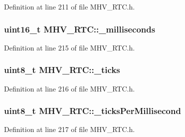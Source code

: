 \-Definition at line 211 of file \-M\-H\-V\-\_\-\-R\-T\-C.\-h.

\hypertarget{class_m_h_v___r_t_c_acd3e486b5e5ee1d8cf9d961c0fdbde57}{
\subsubsection[{\-\_\-milliseconds}]{\setlength{\rightskip}{0pt plus 5cm}uint16\-\_\-t {\bf \-M\-H\-V\-\_\-\-R\-T\-C\-::\-\_\-milliseconds}}}
\label{class_m_h_v___r_t_c_acd3e486b5e5ee1d8cf9d961c0fdbde57}


\-Definition at line 215 of file \-M\-H\-V\-\_\-\-R\-T\-C.\-h.

\hypertarget{class_m_h_v___r_t_c_ab29c30f80f7234394299476c73f36baf}{
\subsubsection[{\-\_\-ticks}]{\setlength{\rightskip}{0pt plus 5cm}uint8\-\_\-t {\bf \-M\-H\-V\-\_\-\-R\-T\-C\-::\-\_\-ticks}}}
\label{class_m_h_v___r_t_c_ab29c30f80f7234394299476c73f36baf}


\-Definition at line 216 of file \-M\-H\-V\-\_\-\-R\-T\-C.\-h.

\hypertarget{class_m_h_v___r_t_c_a48e7d03e90e78881ed8833d6e4f77b36}{
\subsubsection[{\-\_\-ticks\-Per\-Millisecond}]{\setlength{\rightskip}{0pt plus 5cm}uint8\-\_\-t {\bf \-M\-H\-V\-\_\-\-R\-T\-C\-::\-\_\-ticks\-Per\-Millisecond}}}
\label{class_m_h_v___r_t_c_a48e7d03e90e78881ed8833d6e4f77b36}


\-Definition at line 217 of file \-M\-H\-V\-\_\-\-R\-T\-C.\-h.

